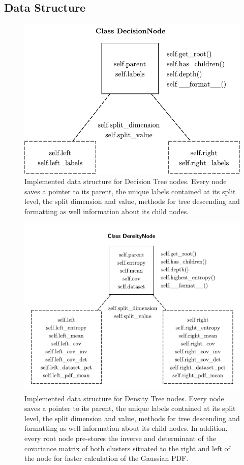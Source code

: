 \documentclass[10pt]{article}
\begin{document}
\subsection{Data Structure}
\begin{figure}[H]
    \centering
    \includegraphics[width=.6\textwidth]{decision-node}
    \caption{Implemented data structure for Decision Tree nodes. Every node saves a pointer to its parent, the unique labels contained at its split level, the split dimension and value, methods for tree descending and formatting as well information about its child nodes.}
    \label{fig:decision-node}
\end{figure}

\begin{figure}[H]
    \centering
    \includegraphics[width=.6\textwidth]{density-node}
    \caption{Implemented data structure for Density Tree nodes. Every node saves a pointer to its parent, the unique labels contained at its split level, the split dimension and value, methods for tree descending and formatting as well information about its child nodes. In addition, every root node pre-stores the inverse and determinant of the covariance matrix of both clusters situated to the right and left of the node for faster calculation of the Gaussian \gls{PDF}.}
    \label{fig:density-node}
\end{figure}
\end{document}

